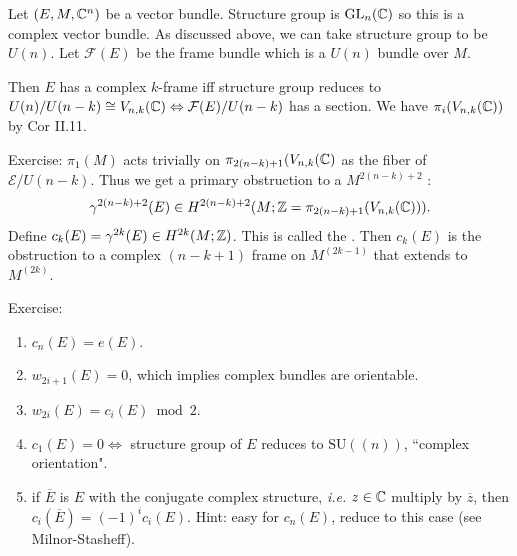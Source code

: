 \documentclass[12pt,class=article,crop=false]{standalone}
\begin{document}
\begin{eg}
Let $(E,M, \mathbb{C}^{n})$ be a vector bundle. Structure group is $ \text{GL}_{ n}(\mathbb{C}) $ so this is a complex vector bundle. As discussed above, we can take structure group to be $ U(n)$. Let  $ \mathcal{ F}(E)$ be the frame bundle which is a $ U(n)$ bundle over  $ M$.

Then  $ E$ has a complex  $ k$-frame iff structure group reduces to  $ U(n) /U(n-k) \cong V_{n,k}( \mathbb{C})\Leftrightarrow \mathcal{ F}(E) / U(n-k)$ has a section. We have $ \pi_i(V_{n,k}( \mathbb{C}))$ by Cor II.11.

Exercise: $ \pi_1(M)$ acts trivially on $ \pi_{2(n-k)+1}(V_{n,k}( \mathbb{C})$ as the fiber of $ \mathcal{ E} / U(n-k)$. Thus we get a primary obstruction to a $ M^{2(n-k)+2}$ :
\begin{align*}
	\gamma^{2(n-k)+2}(E) \in H^{2(n-k)+2}(M; \mathbb{Z} = \pi_{2(n-k)+1}(V_{n,k}( \mathbb{C}))).
\end{align*}
Define $ c_k(E) = \gamma^{2k}(E) \in H^{2k}(M;\mathbb{Z})$. This is called the . Then  $ c_k(E)$ is the obstruction to a complex $ (n-k+1)$ frame on  $ M^{(2k-1)}$ that extends to $ M^{(2k)}$.

Exercise:
\begin{enumerate}[label=(\arabic*)]
	\item $ c_n(E) = e(E)$.
	\item $ w_{2i+1}(E) = 0$, which implies complex bundles are orientable.
	\item $ w_{2i}(E) = c_i(E) \bmod 2$.
	\item $ c_1(E) = 0 \iff$ structure group of $ E$ reduces to  $ \text{SU}((n)) $, ``complex orientation".
	\item if $ \overline{E}$ is $ E$ with the conjugate complex structure,  \emph{i.e.} $ z \in \mathbb{C}$ multiply by $ \overline{z}$, then $ c_i( \overline{E}) = (-1)^{i}c_i(E)$. Hint: easy for $ c_n(E)$, reduce to this case (see Milnor-Stasheff).
\end{enumerate}
\end{eg}
\end{document}
